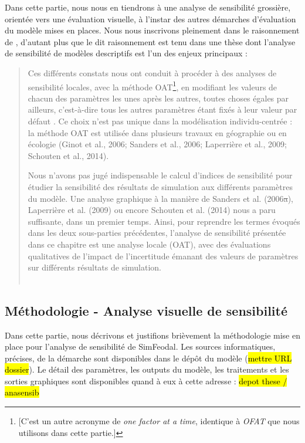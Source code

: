 Dans cette partie, nous nous en tiendrons à une analyse de sensibilité grossière, orientée vers une évaluation visuelle, à l'instar des autres démarches d'évaluation du modèle mises en places.
Nous nous inscrivons pleinement dans le raisonnement de , d'autant plus que le dit raisonnement est tenu dans une thèse dont l'analyse de sensibilité de modèles descriptifs est l'un des enjeux principaux :
\begin{quotation}
	\og Ces différents constats nous ont conduit à procéder à des analyses de sensibilité locales, avec la méthode OAT\footnote{
		[C'est un autre acronyme de \og \textit{one factor at a time}\fg{}, identique à \textit{OFAT} que nous utilisons dans cette partie.]
	}, en modifiant les valeurs de chacun des paramètres les unes après les autres, toutes choses égales par ailleurs, c’est-à-dire tous les autres paramètres étant fixés à leur valeur par défaut \textelp{}.
	Ce choix n’est pas unique dans la modélisation individu-centrée : la méthode OAT est utilisée dans plusieurs travaux en géographie ou en écologie (Ginot et al., 2006; Sanders et al., 2006; Laperrière et al., 2009; Schouten et al., 2014).
	
	Nous n’avons pas jugé indispensable le calcul d’indices de sensibilité pour étudier la sensibilité des résultats de simulation aux différents paramètres du modèle.
	Une analyse graphique à la manière de Sanders et al. (2006\st{a}), Laperrière et al. (2009) ou encore Schouten et al. (2014) nous a paru suffisante, dans un premier temps.
	Ainsi, pour reprendre les termes évoqués dans les deux sous-parties précédentes, l’analyse de sensibilité présentée dans ce chapitre est une analyse locale (OAT), avec des évaluations qualitatives de l’impact de l’incertitude émanant des valeurs de paramètres sur différents résultats de simulation.\fg{}\\
	\mbox{}~ \hfill \cite[251-252]{hirtzel2015exploration}
\end{quotation}


\subsection{Méthodologie - Analyse visuelle de sensibilité}

Dans cette partie, nous décrivons et justifions brièvement la méthodologie mise en place pour l'analyse de sensibilité de SimFeodal.
Les sources informatiques, précises, de la démarche sont disponibles dans le dépôt du modèle (\hl{mettre URL dossier}).
Le détail des paramètres, les outputs du modèle, les traitements et les sorties graphiques sont disponibles quand à eux à cette adresse : \hl{depot these / anasensib}


